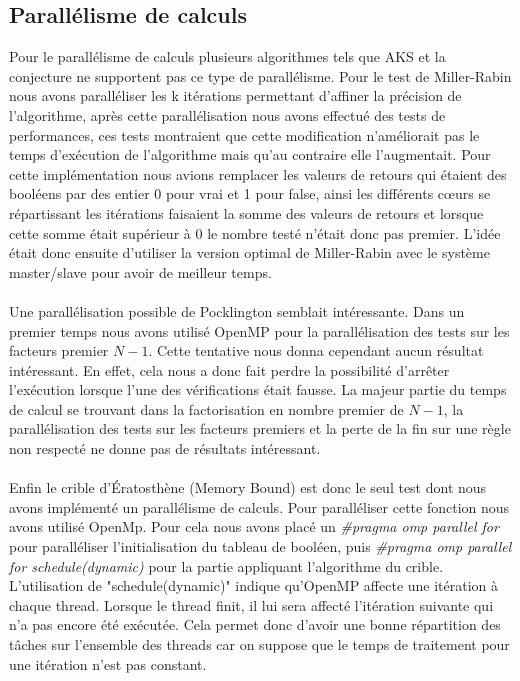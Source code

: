 		\subsection{Parallélisme de calculs}		
	Pour le parallélisme de calculs plusieurs algorithmes tels que AKS et la conjecture ne supportent pas ce type de parallélisme. Pour le test de Miller-Rabin nous avons paralléliser les k itérations permettant d'affiner la précision de l'algorithme, après cette parallélisation nous avons effectué des tests de performances, ces tests montraient que cette modification n'améliorait pas le temps d'exécution de l'algorithme mais qu'au contraire elle l'augmentait. Pour cette implémentation nous avions remplacer les valeurs de retours qui étaient des booléens par des entier 0 pour vrai et 1 pour false, ainsi les différents cœurs se répartissant les itérations faisaient la somme des valeurs de retours et lorsque cette somme était supérieur à 0 le nombre testé n'était donc pas premier. L'idée était donc ensuite d'utiliser la version optimal de Miller-Rabin avec le système master/slave pour avoir de meilleur temps.
	
	\paragraph{}Une parallélisation possible de Pocklington semblait intéressante. Dans un premier temps nous avons utilisé OpenMP pour la parallélisation des tests sur les facteurs premier $N-1$. Cette tentative nous donna cependant aucun résultat intéressant. En effet, cela nous a donc fait perdre la possibilité d'arrêter l'exécution lorsque l'une des vérifications était fausse. La majeur partie du temps de calcul se trouvant dans la factorisation en nombre premier de $N-1$, la parallélisation des tests sur les facteurs premiers et la perte de la fin sur une règle non respecté ne donne pas de résultats intéressant. 
	
	\paragraph{}Enfin le crible d’Ératosthène (Memory Bound) est donc le seul test dont nous avons implémenté un parallélisme de calculs. Pour paralléliser cette fonction nous avons utilisé OpenMp. Pour cela nous avons placé un \textit{\#pragma omp parallel for} pour paralléliser l'initialisation du tableau de booléen, puis
\textit{\#pragma omp parallel for schedule(dynamic)}	pour la partie appliquant l'algorithme du crible. L'utilisation de "schedule(dynamic)" indique qu'OpenMP affecte une itération à chaque thread. Lorsque le thread finit, il lui sera affecté l’itération suivante qui n’a pas encore été exécutée. Cela permet donc d'avoir une bonne répartition des tâches sur l'ensemble des threads car on suppose que le temps de traitement pour une itération n'est pas constant.
	
